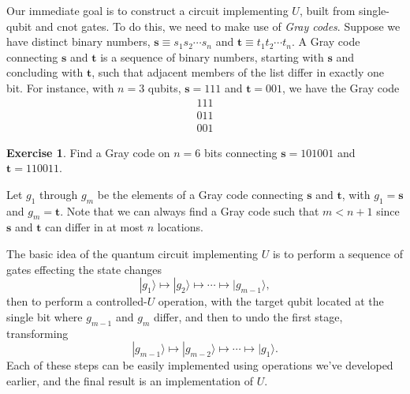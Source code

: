 \documentclass[12pt,oneside]{amsart}
\theoremstyle{plain}%
\theoremstyle{definition}
\newtheorem{exercise}{\color{cgblue}Exercise}[section]
\theoremstyle{remark}
\begin{document}
Our immediate goal is to construct a circuit implementing $U$, built from single-qubit and {\sc cnot} gates. To do this, we need to make use of \emph{Gray codes}. Suppose we have distinct binary numbers, $\textbf{s} \equiv s_1s_2\cdots s_n$ and $\textbf{t} \equiv t_1t_2\cdots t_n$. A Gray code connecting $\textbf{s}$ and $\textbf{t}$ is a sequence of binary numbers, starting with $\textbf{s}$ and concluding with $\textbf{t}$, such that adjacent members of the list differ in exactly one bit. For instance, with $n=3$ qubits, $\textbf{s} = 111$ and $\textbf{t} = 001$, we have the Gray code
\begin{equation}
  \begin{matrix}
    111 \\
    011 \\
    001
  \end{matrix}
\end{equation}

\begin{exercise}
   Find a Gray code on $n=6$ bits connecting $\textbf{s} = 101001$ and $\textbf{t}=110011$.
\end{exercise}

Let $g_1$ through $g_m$ be the elements of a Gray code connecting $\textbf{s}$ and $\textbf{t}$, with $g_1 = \textbf{s}$ and $g_m = \textbf{t}$. Note that we can always find a Gray code such that $m < n+1$ since $\textbf{s}$ and $\textbf{t}$ can differ in at most $n$ locations. 

The basic idea of the quantum circuit implementing $U$ is to perform a sequence of gates effecting the state changes  
\begin{equation}
  |g_1\rangle \mapsto |g_2\rangle \mapsto \cdots \mapsto |g_{m-1}\rangle,
\end{equation}
then to perform a controlled-$U$ operation, with the target qubit located at the single bit where $g_{m-1}$ and $g_m$ differ, and then to undo the first stage, transforming 
\begin{equation}
  |g_{m-1}\rangle \mapsto |g_{m-2}\rangle \mapsto \cdots \mapsto |g_{1}\rangle.
\end{equation}
Each of these steps can be easily implemented using operations we’ve developed earlier, and the final result is an implementation of $U$.
\end{document}
